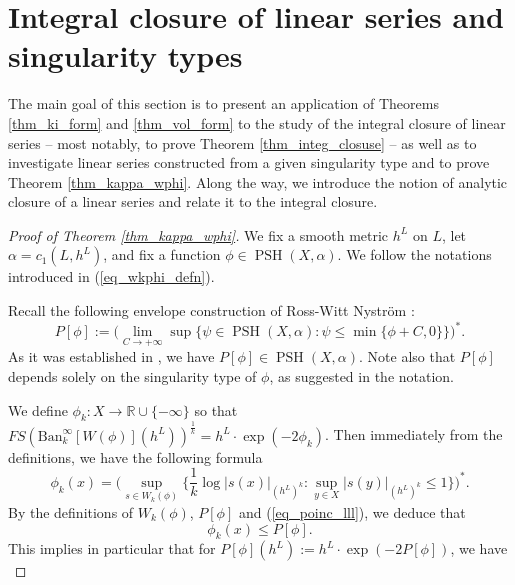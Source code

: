 \documentclass[12pt]{article}
\numberwithin{equation}{section}
\theoremstyle{theorem}
\theoremstyle{definition}
\theoremstyle{remark}
\newcommand{\real}{\mathbb{R}}
\newcommand{\psh}{\operatorname{PSH}}
\begin{document}
	\section{Integral closure of linear series and singularity types}\label{sect_lin_ser_sing_type}
	The main goal of this section is to present an application of Theorems \ref{thm_ki_form} and \ref{thm_vol_form} to the study of the integral closure of linear series -- most notably, to prove Theorem \ref{thm_integ_closuse} -- as well as to investigate linear series constructed from a given singularity type and to prove Theorem \ref{thm_kappa_wphi}. 
	Along the way, we introduce the notion of analytic closure of a linear series and relate it to the integral closure.
	\par 
	\begin{proof}[Proof of Theorem \ref{thm_kappa_wphi}]
		We fix a smooth metric $h^L$ on $L$, let $\alpha = c_1(L, h^L)$, and fix a function $\phi \in \psh(X, \alpha)$. 
		We follow the notations introduced in (\ref{eq_wkphi_defn}).
		\par 
		Recall the following envelope construction of Ross-Witt Nystr{\"o}m \cite{RossWNEnvelop}:
		\begin{equation}
			P[\phi] := 
			\Big(
			\lim_{C \to + \infty}
			\sup\Big\{
				\psi \in \psh(X, \alpha) : \psi \leq \min\{ \phi + C, 0 \}
			\Big\}
			\Big)^*.
		\end{equation}
		As it was established in \cite{RossWNEnvelop}, we have $P[\phi] \in \psh(X, \alpha)$.
		Note also that $P[\phi]$ depends solely on the singularity type of $\phi$, as suggested in the notation.
		\par 
		We define $\phi_k : X \to \real \cup \{ -\infty \}$ so that $FS(\textrm{Ban}_k^{\infty}[W(\phi)](h^L))^{\frac{1}{k}} = h^L \cdot \exp(- 2 \phi_k)$.
		Then immediately from the definitions, we have the following formula
		\begin{equation}\label{eq_phi_k_defn_sup_wkphi}
			 \phi_k(x)
			 =
			 \Big(
			 \sup_{s \in W_k(\phi)} \Big\{
			 	\frac{1}{k} \log |s(x)|_{(h^L)^k} : \sup_{y \in X} |s(y)|_{(h^L)^k} \leq 1
			\Big\}
			\Big)^*.
		\end{equation}
		By the definitions of $W_k(\phi)$, $P[\phi]$ and (\ref{eq_poinc_lll}), we deduce that 
		\begin{equation}
			\phi_k(x) 
			\leq
			P[\phi].
		\end{equation}
		This implies in particular that for $P[\phi](h^L) := h^L \cdot \exp(- 2 P[\phi])$, we have
		\begin{equation}\label{eq_pphi_comp}

\end{equation}
\end{proof}
\end{document}
